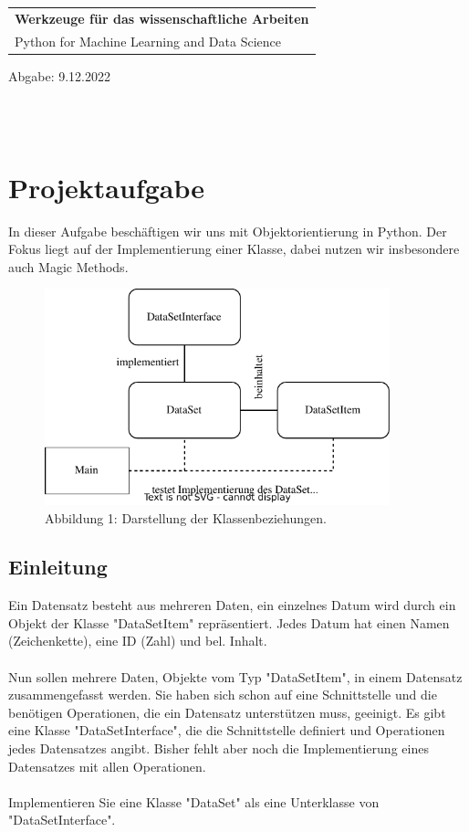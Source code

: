 \documentclass[]{article}
\begin{document}
\begin{center}
\begin{tabular}{l}
     \Large\textbf{Werkzeuge für das wissenschaftliche Arbeiten} \\
     \Large Python for Machine Learning and Data Science \\ 
\end{tabular} 
    Abgabe: 9.12.2022
\end{center}
\hline \\


\tableofcontents
\\

\section{Projektaufgabe}
In dieser Aufgabe beschäftigen wir uns mit Objektorientierung in Python. Der
Fokus liegt auf der Implementierung einer Klasse, dabei nutzen wir insbesondere
auch Magic Methods.\\

\begin{figure}[h]
    \centering
    \includegraphics[width=10cm]{./../diagram/classes_files.pdf}
    \caption{Abbildung 1: Darstellung der Klassenbeziehungen.}
    \label{fig:my_label}
\end{figure}


\subsection{Einleitung}
Ein Datensatz besteht aus mehreren Daten, ein einzelnes Datum wird durch ein Objekt der Klasse "DataSetItem" repräsentiert.
Jedes Datum hat einen Namen (Zeichenkette), eine ID (Zahl) und bel. Inhalt.\\
\\
Nun sollen mehrere Daten, Objekte vom Typ "DataSetItem", in einem Datensatz zusammengefasst werden.
Sie haben sich schon auf eine Schnittstelle und die benötigen Operationen, die ein Datensatz unterstützen muss, geeinigt.
Es gibt eine Klasse "DataSetInterface", die die Schnittstelle definiert und Operationen jedes Datensatzes angibt.
Bisher fehlt aber noch die Implementierung eines Datensatzes mit allen Operationen.\\
\\
Implementieren Sie eine Klasse "DataSet" als eine Unterklasse von "DataSetInterface".\\
\\
\end{document}
